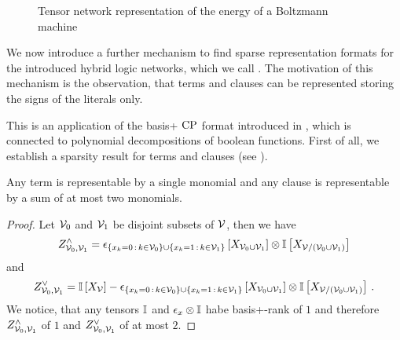 \begin{figure}[t]
    \begin{center}
        
    \end{center}
    \caption{Tensor network representation of the energy of a Boltzmann machine}
    \label{fig:boltzmannEnergy}
\end{figure}

\subsect{\PolynomialSparsity{}}\label{sec:HLNpolyRepresentation}

We now introduce a further mechanism to find sparse representation formats for the introduced hybrid logic networks, which we call \polynomialSparsity{}.
The motivation of this mechanism is the observation, that terms and clauses can be represented storing the signs of the literals only.

This is an application of the basis+ $\mathrm{CP}$ format introduced in , which is connected to polynomial decompositions of boolean functions.
First of all, we establish a sparsity result for terms and clauses (see ).

\begin{lemma}
    \label{lem:clauseTermBasisPlus}
    Any term is representable by a single monomial and any clause is representable by a sum of at most two monomials. %
\end{lemma}
\begin{proof}
    Let $\mathcal{V}_0$ and $\mathcal{V}_1$ be disjoint subsets of $\mathcal{V}$, then we have
    \begin{align*}
        Z^{\land}_{\mathcal{V}_0,\mathcal{V}_1} = \epsilon_{
            \{x_{k} = 0 \,:\, k\in\mathcal{V}_0\} \cup \{x_{k} = 1 \,:\, k\in\mathcal{V}_1\}
        }\left[X_{\mathcal{V}_0\cup\mathcal{V}_1}\right] \otimes \mathbb{I}\left[X_{\mathcal{V}/(\mathcal{V}_0\cup\mathcal{V}_1)}\right]
    \end{align*}
    and
    \begin{align*}
        Z^{\lor}_{\mathcal{V}_0,\mathcal{V}_1} = \mathbb{I}\left[X_{\mathcal{V}}\right] - \epsilon_{
            \{x_{k} = 0 \,:\, k\in\mathcal{V}_0\} \cup \{x_{k} = 1 \,:\, k\in\mathcal{V}_1\}
        }\left[X_{\mathcal{V}_0\cup\mathcal{V}_1}\right]
        \otimes \mathbb{I}\left[X_{\mathcal{V}/(\mathcal{V}_0\cup\mathcal{V}_1)}\right] \, .
    \end{align*}
    We notice, that any tensors $\mathbb{I}$ and $\epsilon_{x}\otimes \mathbb{I}$ habe basis+-rank of $1$ and therefore $Z^{\land}_{\mathcal{V}_0,\mathcal{V}_1}$ of $1$ and $Z^{\lor}_{\mathcal{V}_0,\mathcal{V}_1}$ of at most $2$.
\end{proof}

